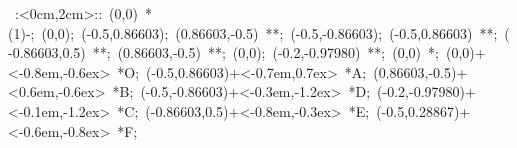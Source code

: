 %


\hbox{
\xy    <2cm,0cm>:<0cm,2cm>::
       (0,0) *\ellipse(1){-}; (0,0); 
       (-0.5,0.86603); (0.86603,-0.5) **\dir{-}; 
       (-0.5,-0.86603); (-0.5,0.86603) **\dir{-};
       (-0.86603,0.5) **\dir{-}; (0.86603,-0.5) **\dir{-}; 
       (0,0); (-0.2,-0.97980) **\dir{-};
       (0,0) *{\bullet};
       (0,0)+<-0.8em,-0.6ex> *{O};
       (-0.5,0.86603)+<-0.7em,0.7ex> *{A};
       (0.86603,-0.5)+<0.6em,-0.6ex> *{B};
       (-0.5,-0.86603)+<-0.3em,-1.2ex> *{D};
       (-0.2,-0.97980)+<-0.1em,-1.2ex> *{C};
       (-0.86603,0.5)+<-0.8em,-0.3ex> *{E};
       (-0.5,0.28867)+<-0.6em,-0.8ex> *{F};
\endxy}

